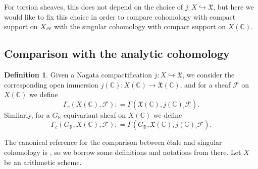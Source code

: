 \documentclass[leqno,12pt]{article}
\theoremstyle{plain}
\theoremstyle{definition}
\newtheorem{definition}[theorem]{\indent\sc Definition}
\newcommand{\CC}{\mathbb{C}}
\newcommand{\RR}{\mathbb{R}}
\newcommand{\dfn}{\mathrel{\mathop:}=}
\newcommand{\et}{\text{\it \'{e}t}}
\begin{document}
For torsion sheaves, this does not depend on the choice of
$j\colon X \hookrightarrow \mathfrak{X}$, but here we would like to fix this
choice in order to compare cohomology with compact support on $X_\et$ with
the singular cohomology with compact support on $X (\CC)$.

\subsection*{Comparison with the analytic cohomology}

\begin{definition}
  Given a Nagata compactification $j\colon X\hookrightarrow \mathfrak{X}$,
  we consider the corresponding open immersion
  $j (\CC)\colon X (\CC) \to \mathfrak{X} (\CC)$,
  and for a sheaf $\mathcal{F}$ on $X (\CC)$ we define
  \[ \Gamma_c (X (\CC), \mathcal{F}) \dfn
  \Gamma (\mathfrak{X} (\CC), j (\CC)_! \mathcal{F}). \]
  Similarly, for a $G_\RR$-equivariant sheaf on $X (\CC)$ we define
  \[ \Gamma_c (G_\RR, X (\CC), \mathcal{F}) \dfn
  \Gamma (G_\RR, \mathfrak{X} (\CC), j (\CC)_! \mathcal{F}). \]
\end{definition}

The canonical reference for the comparison between \'{e}tale and singular
cohomology is \cite[Expos\'{e}~XI, \S 4]{SGA4}, so we borrow some definitions
and notations from there. Let $X$ be an arithmetic scheme.
\end{document}
